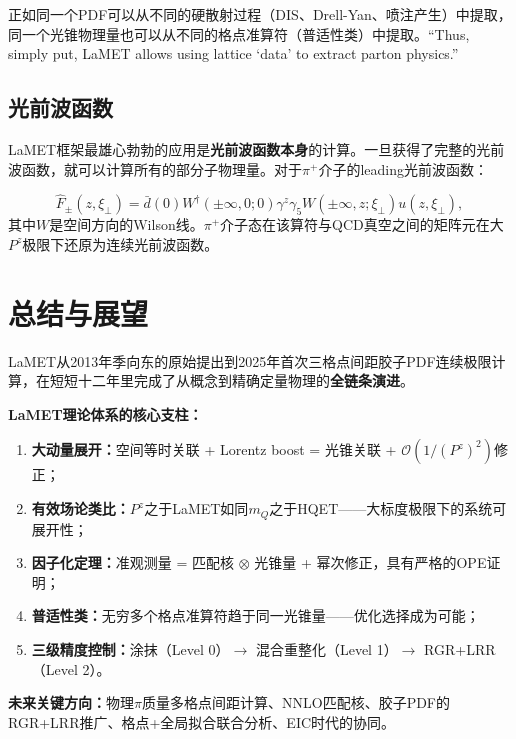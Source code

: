 \documentclass[12pt,a4paper]{ctexart}
\theoremstyle{definition}
\begin{document}
正如同一个PDF可以从不同的硬散射过程（DIS、Drell-Yan、喷注产生）中提取，同一个光锥物理量也可以从不同的格点准算符（普适性类）中提取。``Thus, simply put, LaMET allows using lattice `data' to extract parton physics.''\cite{Ji2014LaMET}

\subsection{光前波函数}

LaMET框架最雄心勃勃的应用是\textbf{光前波函数本身}的计算\cite{Ji2014LaMET}。一旦获得了完整的光前波函数，就可以计算所有的部分子物理量。对于$\pi^+$介子的leading光前波函数：

\begin{equation}
\hat{F}_\pm(z, \xi_\perp) = \bar{d}(0) W^\dagger(\pm\infty, 0; 0) \gamma^z\gamma_5 W(\pm\infty, z; \xi_\perp) u(z, \xi_\perp),
\end{equation}
其中$W$是空间方向的Wilson线。$\pi^+$介子态在该算符与QCD真空之间的矩阵元在大$P^z$极限下还原为连续光前波函数。

\section{总结与展望}

LaMET从2013年季向东的原始提出\cite{Ji2013Euclidean}到2025年首次三格点间距胶子PDF连续极限计算\cite{Chen2025gluon}，在短短十二年里完成了从概念到精确定量物理的\textbf{全链条演进}。

\textbf{LaMET理论体系的核心支柱：}

\begin{enumerate}
    \item \textbf{大动量展开：}空间等时关联 + Lorentz boost = 光锥关联 + $\mathcal{O}(1/(P^z)^2)$修正；
    \item \textbf{有效场论类比：}$P^z$之于LaMET如同$m_Q$之于HQET——大标度极限下的系统可展开性；
    \item \textbf{因子化定理：}准观测量 = 匹配核 $\otimes$ 光锥量 + 幂次修正，具有严格的OPE证明；
    \item \textbf{普适性类：}无穷多个格点准算符趋于同一光锥量——优化选择成为可能；
    \item \textbf{三级精度控制：}涂抹（Level 0）$\to$ 混合重整化（Level 1）$\to$ RGR+LRR（Level 2）。
\end{enumerate}

\textbf{未来关键方向：}物理$\pi$质量多格点间距计算、NNLO匹配核、胶子PDF的RGR+LRR推广、格点+全局拟合联合分析、EIC时代的协同。
\end{document}
